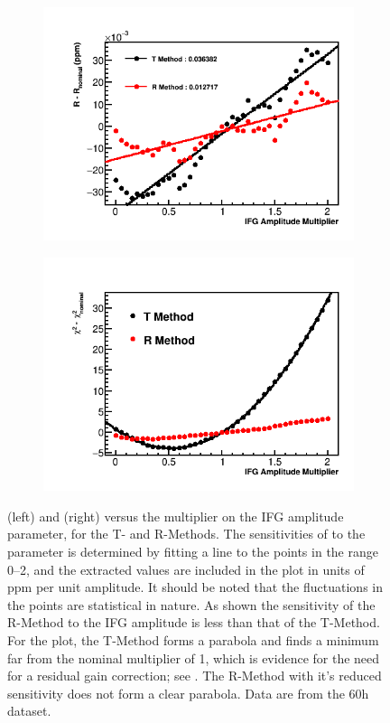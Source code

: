 \begin{figure}[h]
\centering
    \begin{subfigure}[t]{0.45\textwidth}
        \centering
        \includegraphics[width=\textwidth]{IFG_Amplitude_Compare_R}
    \end{subfigure}%
    \hspace{1cm}
    \begin{subfigure}[t]{0.45\textwidth}
        \centering
        \includegraphics[width=\textwidth]{IFG_Amplitude_Compare_Chisq}
    \end{subfigure}
\caption[]{\R (left) and \chisq (right) versus the multiplier on the IFG amplitude parameter, for the T- and R-Methods. The sensitivities of \R to the parameter is determined by fitting a line to the points in the range 0--2, and the extracted values are included in the plot in units of ppm per unit amplitude. It should be noted that the fluctuations in the points are statistical in nature. As shown the sensitivity of the R-Method to the IFG amplitude is less than that of the T-Method. For the \chisq plot, the T-Method forms a parabola and finds a minimum far from the nominal multiplier of 1, which is evidence for the need for a residual gain correction; see . The R-Method with it's reduced sensitivity does not form a clear parabola. Data are from the 60h dataset.}

\end{figure}
